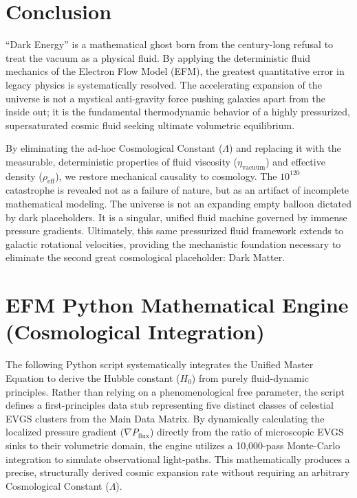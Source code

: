 \documentclass[11pt, a4paper, table]{article}
\begin{document}
\section{Conclusion}
  ``Dark Energy'' is a mathematical ghost born from the century-long refusal to treat the vacuum as a physical fluid. By applying the deterministic fluid mechanics of the Electron Flow Model (EFM), the greatest quantitative error in legacy physics is systematically resolved. The accelerating expansion of the universe is not a mystical anti-gravity force pushing galaxies apart from the inside out; it is the fundamental thermodynamic behavior of a highly pressurized, supersaturated cosmic fluid seeking ultimate volumetric equilibrium.

  By eliminating the ad-hoc Cosmological Constant ($\Lambda$) and replacing it with the measurable, deterministic properties of fluid viscosity ($\eta_{\text{vacuum}}$) and effective density ($\rho_{\text{eff}}$), we restore mechanical causality to cosmology. The $10^{120}$ catastrophe is revealed not as a failure of nature, but as an artifact of incomplete mathematical modeling. The universe is not an expanding empty balloon dictated by dark placeholders. It is a singular, unified fluid machine governed by immense pressure gradients. Ultimately, this same pressurized fluid framework extends to galactic rotational velocities, providing the mechanistic foundation necessary to eliminate the second great cosmological placeholder: Dark Matter.

\appendix
\renewcommand{\thesection}{Appendix \Alph{section}:}

\section[EFM Python Mathematical Engine (Cosmological Integration)]
  {EFM Python Mathematical Engine \\ (Cosmological Integration)}

  The following Python script systematically integrates the Unified Master Equation to derive the Hubble constant ($H_0$) from purely fluid-dynamic principles. Rather than relying on a phenomenological free parameter, the script defines a first-principles data stub representing five distinct classes of celestial EVGS clusters from the Main Data Matrix. By dynamically calculating the localized pressure gradient ($\nabla P_{\text{flux}}$) directly from the ratio of microscopic EVGS sinks to their volumetric domain, the engine utilizes a 10,000-pass Monte-Carlo integration to simulate observational light-paths. This mathematically produces a precise, structurally derived cosmic expansion rate without requiring an arbitrary Cosmological Constant ($\Lambda$).
\end{document}
